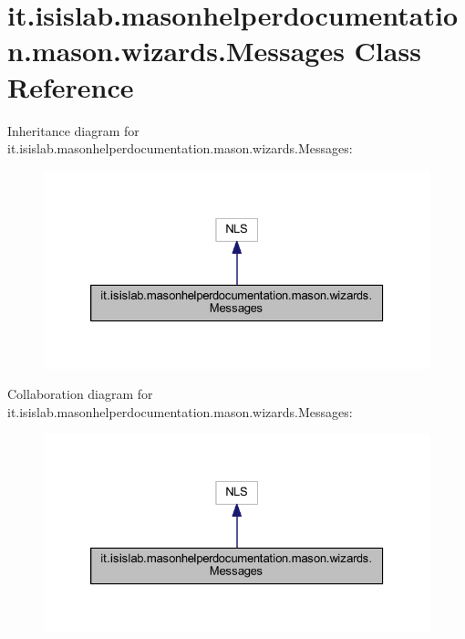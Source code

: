 \hypertarget{classit_1_1isislab_1_1masonhelperdocumentation_1_1mason_1_1wizards_1_1_messages}{\section{it.\-isislab.\-masonhelperdocumentation.\-mason.\-wizards.\-Messages Class Reference}
\label{classit_1_1isislab_1_1masonhelperdocumentation_1_1mason_1_1wizards_1_1_messages}
}


Inheritance diagram for it.\-isislab.\-masonhelperdocumentation.\-mason.\-wizards.\-Messages\-:
\nopagebreak
\begin{figure}[H]
\begin{center}
\leavevmode
\includegraphics[width=326pt]{classit_1_1isislab_1_1masonhelperdocumentation_1_1mason_1_1wizards_1_1_messages__inherit__graph}
\end{center}
\end{figure}


Collaboration diagram for it.\-isislab.\-masonhelperdocumentation.\-mason.\-wizards.\-Messages\-:
\nopagebreak
\begin{figure}[H]
\begin{center}
\leavevmode
\includegraphics[width=326pt]{classit_1_1isislab_1_1masonhelperdocumentation_1_1mason_1_1wizards_1_1_messages__coll__graph}
\end{center}
\end{figure}
